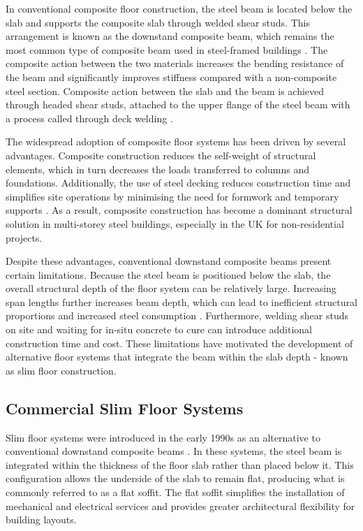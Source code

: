 In conventional composite floor construction, the steel beam is located below the slab and supports the composite slab through welded shear studs. This arrangement is known as the downstand composite beam, which remains the most common type of composite beam used in steel-framed buildings \citep{RefWorks:ahmed2019evolution}. The composite action between the two materials increases the bending resistance of the beam and significantly improves stiffness compared with a non-composite steel section. Composite action between the slab and the beam is achieved through headed shear studs, attached to the upper flange of the steel beam with a process called through deck welding \citep{RefWorks:composite}.

The widespread adoption of composite floor systems has been driven by several advantages. Composite construction reduces the self-weight of structural elements, which in turn decreases the loads transferred to columns and foundations. Additionally, the use of steel decking reduces construction time and simplifies site operations by minimising the need for formwork and temporary supports \citep{RefWorks:lawson1999slimflor}. As a result, composite construction has become a dominant structural solution in multi-storey steel buildings, especially in the UK for non-residential projects.

Despite these advantages, conventional downstand composite beams present certain limitations. Because the steel beam is positioned below the slab, the overall structural depth of the floor system can be relatively large. Increasing span lengths further increases beam depth, which can lead to inefficient structural proportions and increased steel consumption \citep{RefWorks:hicks2003current}. Furthermore, welding shear studs on site and waiting for in-situ concrete to cure can introduce additional construction time and cost. These limitations have motivated the development of alternative floor systems that integrate the beam within the slab depth - known as slim floor construction.

\subsection{Commercial Slim Floor Systems} \label{sec:commercial_slim_floor}
Slim floor systems were introduced in the early 1990s as an alternative to conventional downstand composite beams \citep{RefWorks:ahmed2019evolution}. In these systems, the steel beam is integrated within the thickness of the floor slab rather than placed below it. This configuration allows the underside of the slab to remain flat, producing what is commonly referred to as a flat soffit. The flat soffit simplifies the installation of mechanical and electrical services and provides greater architectural flexibility for building layouts.

